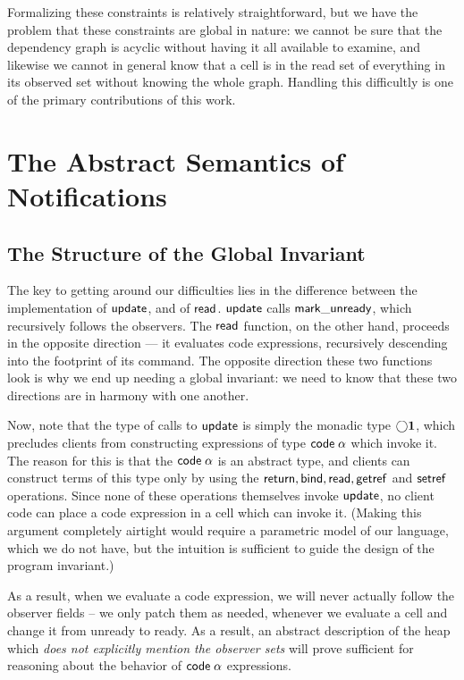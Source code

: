 Formalizing these constraints is relatively straightforward, but we
have the problem that these constraints are global in nature:
we cannot be sure that the dependency graph is acyclic without having
it all available to examine, and likewise we cannot in general know
that a cell is in the read set of everything in its observed set
without knowing the whole graph. Handling this difficultly is one of
the primary contributions of this work. 

\section{The Abstract Semantics of Notifications}

\subsection{The Structure of the Global Invariant}

The key to getting around our difficulties lies in the difference
between the implementation of $\mathsf{update}$, and of $\mathsf{read}$.
$\mathsf{update}$ calls $\mathsf{mark\_unready}$, which recursively follows
the observers. The $\mathsf{read}$ function, on the other hand,
proceeds in the opposite direction --- it evaluates code expressions,
recursively descending into the footprint of its command. The opposite
direction these two functions look is why we end up needing a global
invariant: we need to know that these two directions are in harmony
with one another.

Now, note that the type of calls to $\mathsf{update}$ is simply the
monadic type $\bigcirc{\mathbf{1}}$, which precludes clients from
constructing expressions of type $\mathsf{code}\;{\alpha}$ which invoke
it. The reason for this is that the $\mathsf{code}\;{\alpha}$ is an abstract
type, and clients can construct terms of this type only by using the
$\mathsf{return}, \mathsf{bind}, \mathsf{read}, \mathsf{getref}$ and
$\mathsf{setref}$ operations. Since none of these operations themselves
invoke $\mathsf{update}$, no client code can place a code expression in a
cell which can invoke it. (Making this argument completely airtight
would require a parametric model of our language, which we do not
have, but the intuition is sufficient to guide the design of the
program invariant.)

As a result, when we evaluate a code expression, we will never
actually follow the observer fields -- we only patch them as
needed, whenever we evaluate a cell and change it from unready to
ready.  As a result, an abstract description of the heap which
\emph{does not explicitly mention the observer sets} will prove
sufficient for reasoning about the behavior of $\mathsf{code}\;{\alpha}$
expressions.


